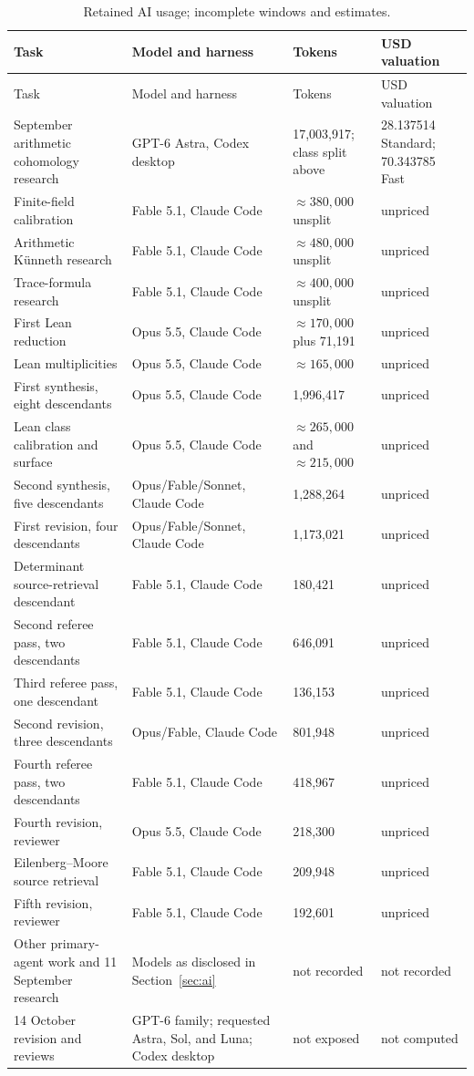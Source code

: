 \documentclass[11pt]{amsart}
\theoremstyle{plain}
\theoremstyle{definition}
\theoremstyle{remark}
\numberwithin{equation}{section}
\begin{document}
{\small
\begin{longtable}{@{}p{}p{}
 p{}p{}@{}}
\caption{Retained AI usage; incomplete windows and estimates.}
\label{tab:tokens}\\
\toprule
Task & Model and harness & Tokens & USD valuation\\
\midrule
\endfirsthead
\toprule
Task & Model and harness & Tokens & USD valuation\\
\midrule
\endhead
\bottomrule
\endfoot
19 September arithmetic cohomology research & GPT-6 Astra, Codex
desktop & 17,003,917; class split above & 28.137514 Standard;
70.343785 Fast\\
Finite-field calibration & Fable 5.1, Claude Code & $\approx380,000$
unsplit & unpriced\\
Arithmetic K\"unneth research & Fable 5.1, Claude Code &
$\approx480,000$ unsplit & unpriced\\
Trace-formula research & Fable 5.1, Claude Code & $\approx400,000$
unsplit & unpriced\\
First Lean reduction & Opus 5.5, Claude Code & $\approx170,000$ plus
71,191 & unpriced\\
Lean multiplicities & Opus 5.5, Claude Code & $\approx165,000$ &
unpriced\\
First synthesis, eight descendants & Opus 5.5, Claude Code &
1,996,417 & unpriced\\
Lean class calibration and surface & Opus 5.5, Claude Code &
$\approx265,000$ and $\approx215,000$ & unpriced\\
Second synthesis, five descendants & Opus/Fable/Sonnet, Claude Code &
1,288,264 & unpriced\\
First revision, four descendants & Opus/Fable/Sonnet, Claude Code &
1,173,021 & unpriced\\
Determinant source-retrieval descendant & Fable 5.1, Claude Code &
180,421 & unpriced\\
Second referee pass, two descendants & Fable 5.1, Claude Code &
646,091 & unpriced\\
Third referee pass, one descendant & Fable 5.1, Claude Code &
136,153 & unpriced\\
Second revision, three descendants & Opus/Fable, Claude Code &
801,948 & unpriced\\
Fourth referee pass, two descendants & Fable 5.1, Claude Code &
418,967 & unpriced\\
Fourth revision, reviewer & Opus 5.5, Claude Code & 218,300 &
unpriced\\
Eilenberg--Moore source retrieval & Fable 5.1, Claude Code &
209,948 & unpriced\\
Fifth revision, reviewer & Fable 5.1, Claude Code & 192,601 &
unpriced\\
Other primary-agent work and 11 September research & Models as
disclosed in Section~\ref{sec:ai} & not recorded & not recorded\\
14 October revision and reviews & GPT-6 family; requested Astra,
Sol, and Luna; Codex desktop & not exposed & not computed\\
\end{longtable}
}



\end{document}
